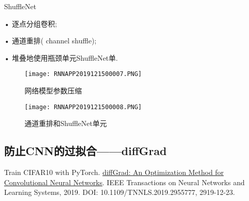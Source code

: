 ShuffleNet

• 逐点分组卷积;

• 通道重排( channel shuffle);

• 堆叠地使用瓶颈单元ShuffleNet单.
\begin{figure}[H]
    \centering
    \texttt{[image: RNNAPP2019121500007.PNG]}
    \caption{网络模型参数压缩}
    \label{RNNAPP2019121500007}\vspace{-0.4cm}
\end{figure}
\begin{figure}[H]
    \centering
    \texttt{[image: RNNAPP2019121500008.PNG]}
    \caption{通道重排和ShuffleNet单元}
    \label{RNNAPP2019121500008}\vspace{-0.4cm}
\end{figure}
\subsection{防止CNN的过拟合——diffGrad}
Train CIFAR10 with PyTorch. \href{https://ieeexplore.ieee.org/document/8939562}{diffGrad: An Optimization Method for Convolutional Neural Networks}. IEEE Transactions on Neural Networks and Learning Systems, 2019.
DOI: 10.1109/TNNLS.2019.2955777, 2919-12-23.

